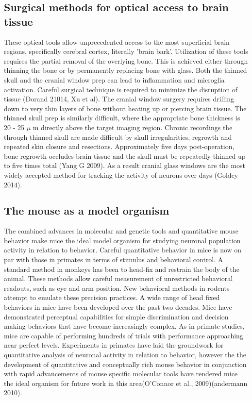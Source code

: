 \subsection{Surgical methods for optical access to brain tissue}
These optical tools allow unprecedented access to the most superficial brain regions, specifically cerebral cortex, literally 'brain bark'. Utilization of these tools requires the partial removal of the overlying bone. This is achieved either through thinning the bone or by permanently replacing bone with glass. Both the thinned skull and the cranial window prep can lead to inflammation and microglia activation. Careful surgical technique is required to minimize the disruption of tissue (Dorand 21014, Xu et al). The cranial window surgery requires drilling down to very thin layers of bone without heating up or piercing brain tissue. The thinned skull prep is similarly difficult, where the appropriate bone thickness is 20 - 25 $\mu$ m directly above the target imaging region. Chronic recordings the through thinned skull are made difficult by skull irregularities, regrowth and repeated skin closure and resections. Approximately five days post-operation, bone regrowth occludes  brain tissue and the skull must be repeatedly thinned up to five times total (Yang G 2009). As a result cranial glass windows are the most widely accepted method for tracking the activity of neurons over days (Goldey 2014).

\subsection{The mouse as a model organism}
The combined advances in molecular and genetic tools and quantitative mouse behavior make mice the ideal model organism for studying neuronal population activity in relation to behavior. Careful quantitative behavior in mice is now on par with those in primates in terms of stimulus and behavioral control. A standard method in monkeys has been to head-fix and restrain the body of the animal. These methods allow careful measurement of unrestricted behavioral readouts, such as eye and arm position. New behavioral methods in rodents attempt to emulate these precision practices. A wide range of head fixed behaviors in mice have been developed over the past two decades. Mice have demonstrated perceptual capabilities for simple discrimination and decision making behaviors that have become increasingly complex. As in primate studies, mice are capable of performing hundreds of trials with performance approaching near perfect levels. Experiments in primates have laid the groundwork for quantitative analysis of neuronal activity in relation to behavior, however the the development of quantitative and conceptually rich mouse behavior in conjunction with rapid advancements of mouse specific molecular tools have rendered mice the ideal organism for future work in this area(O'Connor et al., 2009)(andermann 2010).

